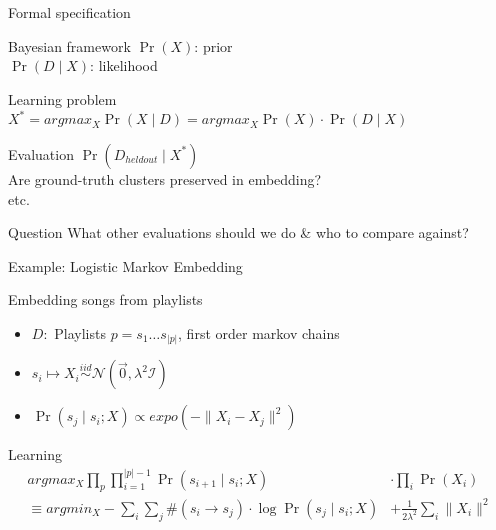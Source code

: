 \documentclass{beamer}
\begin{document}
\begin{frame}{Formal specification}
  \begin{block}{Bayesian framework}
    $\Pr(X)$: prior\\
    $\Pr(D \mid X)$: likelihood
  \end{block}
  \begin{block}{Learning problem}
	$X^* = argmax_{ X } \Pr(X \mid D) = argmax_{ X } \Pr(X) \cdot \Pr(D \mid X)$
  \end{block}
  \begin{block}{Evaluation}
	$\Pr(D_{heldout} \mid X^*)$\\
    Are ground-truth clusters preserved in embedding?\\
    etc.
  \end{block}
  \pause
  \begin{alertblock}{Question}
	What other evaluations should we do \& who to compare against?
  \end{alertblock}
\end{frame}

\begin{frame}{Example: Logistic Markov Embedding}
  \begin{block}{Embedding songs from playlists \cite{LME}}
  	\begin{itemize}
    		\item $D: $ Playlists $p = s_1 \dots s_{|p|}$, first order markov chains
    		\item $s_i \mapsto X_i \overset{iid}{\sim} \mathcal{N}(\vec{0}, \lambda^2 \mathcal{I})$\\
    		\item $\Pr(s_j \mid s_i ; X) \propto expo(-\| X_i - X_j \|^2)$
    \end{itemize}
    \end{block}
    \begin{block}{Learning}
    		\begin{align*}
    		argmax_{ X } \prod_p \prod_{i=1}^{|p|-1} \Pr(s_{i+1} \mid s_i ; X) &\cdot \prod_i \Pr(X_i) \\
		\equiv argmin_{ X } -\sum_i \sum_j \#(s_i \rightarrow s_j) \cdot \log \Pr(s_j \mid s_i ; X) &+ \frac{1}{2 \lambda^2} \sum_i \| X_i \|^2
		\end{align*}
    \end{block}
\end{frame}
\end{document}
